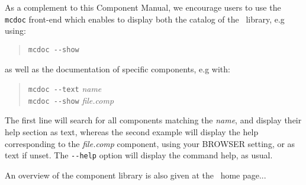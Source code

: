 As a complement to this Component Manual, we encourage users to use
the \verb+mcdoc+ front-end which enables to display both the
catalog of the \MCS\ library, e.g using: 
\begin{quote}
  \verb|mcdoc --show|
\end{quote}
as well as the documentation of specific components, e.g with:
\begin{quote}
  \verb|mcdoc --text| {\it name} \\
  \verb|mcdoc --show| {\it file.comp}
\end{quote}
The first line will search for all components matching the {\it name},
and display their help section as text,
whereas the second example will display the help corresponding to
the {\it file.comp} component, using your
BROWSER setting, or as text if unset.
The \verb+--help+ option will display the command help, as usual.

An overview of the component library is also given at the \MCS\ home page...

%
%
%
%
%
%
%
%






